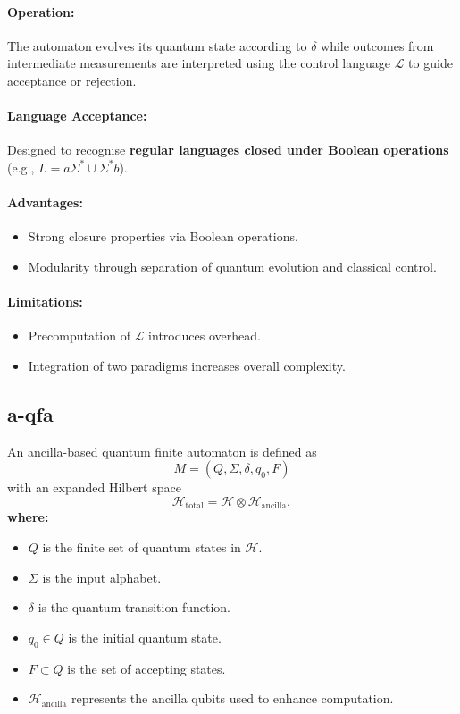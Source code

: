 \paragraph{Operation:}  
The automaton evolves its quantum state according to \( \delta \) while outcomes from intermediate measurements are interpreted using the control language \( \mathcal{L} \) to guide acceptance or rejection.

\paragraph{Language Acceptance:}  
Designed to recognise \textbf{regular languages closed under Boolean operations} (e.g., \( L = a\Sigma^* \cup \Sigma^* b \)).

\paragraph{Advantages:}
\begin{itemize}
    \item Strong closure properties via Boolean operations.
    \item Modularity through separation of quantum evolution and classical control.
\end{itemize}

\paragraph{Limitations:}
\begin{itemize}
    \item Precomputation of \( \mathcal{L} \) introduces overhead.
    \item Integration of two paradigms increases overall complexity.
\end{itemize}

\subsection{\acrfull{a-qfa}}
\label{subsec:a-qfa}
\begin{definition}
An ancilla-based quantum finite automaton is defined as 
\[
M = (Q, \Sigma, \delta, q_0, F)
\]
with an expanded Hilbert space 
\[
\mathcal{H}_{\text{total}} = \mathcal{H} \otimes \mathcal{H}_{\text{ancilla}},
\]
\textbf{where:}
\begin{itemize}
    \item \( Q \) is the finite set of quantum states in \( \mathcal{H} \).
    \item \( \Sigma \) is the input alphabet.
    \item \( \delta \) is the quantum transition function.
    \item \( q_0 \in Q \) is the initial quantum state.
    \item \( F \subset Q \) is the set of accepting states.
    \item \( \mathcal{H}_{\text{ancilla}} \) represents the ancilla qubits used to enhance computation.
\end{itemize}
\end{definition}


